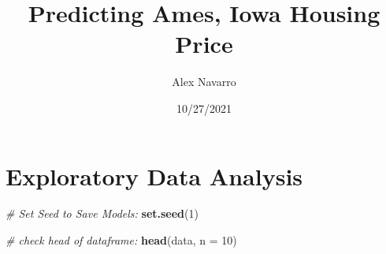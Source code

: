 \documentclass[
]{article}
\title{Predicting Ames, Iowa Housing Price}
\author{Alex Navarro}
\date{10/27/2021}
\newenvironment{Shaded}{\begin{snugshade}}{\end{snugshade}}
\newcommand{\CommentTok}[1]{\textcolor[rgb]{0.56,0.35,0.01}{\textit{#1}}}
\newcommand{\DataTypeTok}[1]{\textcolor[rgb]{0.13,0.29,0.53}{#1}}
\newcommand{\DecValTok}[1]{\textcolor[rgb]{0.00,0.00,0.81}{#1}}
\newcommand{\KeywordTok}[1]{\textcolor[rgb]{0.13,0.29,0.53}{\textbf{#1}}}
\newcommand{\NormalTok}[1]{#1}
\begin{document}
\maketitle

\hypertarget{exploratory-data-analysis}{%
\section{Exploratory Data Analysis}\label{exploratory-data-analysis}}

\begin{Shaded}
\begin{Highlighting}[]
\CommentTok{# Set Seed to Save Models:}
\KeywordTok{set.seed}\NormalTok{(}\DecValTok{1}\NormalTok{)}

\CommentTok{# check head of dataframe:}
\KeywordTok{head}\NormalTok{(data, }\DataTypeTok{n =} \DecValTok{10}\NormalTok{)}
\end{Highlighting}
\end{Shaded}
\end{document}
